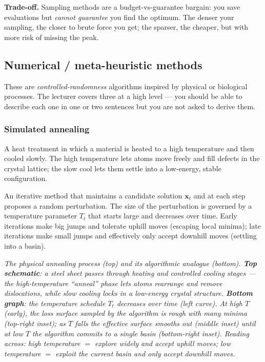 \documentclass[11pt, a4paper]{article}
\begin{document}
\textbf{Trade-off.} Sampling methods are a budget-vs-guarantee bargain: you save evaluations but \emph{cannot guarantee} you find the optimum. The denser your sampling, the closer to brute force you get; the sparser, the cheaper, but with more risk of missing the peak.

\subsection{Numerical / meta-heuristic methods}

These are \emph{controlled-randomness} algorithms inspired by physical or biological processes. The lecturer covers three at a high level — you should be able to describe each one in one or two sentences but you are not asked to derive them.

\subsubsection*{Simulated annealing}

\begin{defbox}
A heat treatment in which a material is heated to a high temperature and then cooled slowly. The high temperature lets atoms move freely and fill defects in the crystal lattice; the slow cool lets them settle into a low-energy, stable configuration.
\end{defbox}

\begin{defbox}
An iterative method that maintains a candidate solution $\mathbf{x}_t$ and at each step proposes a random perturbation. The size of the perturbation is governed by a temperature parameter $T_t$ that starts large and decreases over time. Early iterations make big jumps and tolerate uphill moves (escaping local minima); late iterations make small jumps and effectively only accept downhill moves (settling into a basin).
\end{defbox}

\begin{center}

\footnotesize\textit{The physical annealing process (top) and its algorithmic analogue (bottom). \textbf{Top schematic}: a steel sheet passes through heating and controlled cooling stages --- the high-temperature ``anneal'' phase lets atoms rearrange and remove dislocations, while slow cooling locks in a low-energy crystal structure. \textbf{Bottom graph}: the temperature schedule $T_t$ decreases over time (left curve). At high $T$ (early), the loss surface sampled by the algorithm is rough with many minima (top-right inset); as $T$ falls the effective surface smooths out (middle inset) until at low $T$ the algorithm commits to a single basin (bottom-right inset). Reading across: high temperature $=$ explore widely and accept uphill moves; low temperature $=$ exploit the current basin and only accept downhill moves.}
\end{center}
\end{document}
